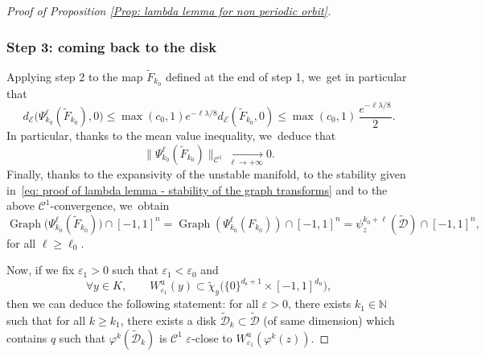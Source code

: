 \documentclass[11pt]{article}
\newcommand{\rs}{\mathrm{s}}
\newcommand{\ru}{\mathrm{u}}
\theoremstyle{definition}
\theoremstyle{plain}
\newcommand{\Ccal}{\mathcal{C}}
\newcommand{\D}{\mathcal{D}}
\newcommand{\Ecal}{\mathcal{E}}
\newcommand{\N}{\mathbb{N}}
\DeclareMathOperator{\Graph}{Graph}
\begin{document}
\begin{appendix}
\begin{proof}[Proof of Proposition \ref{Prop: lambda lemma for non periodic orbit}]
\subsubsection*{Step 3: coming back to the disk}
Applying step 2 to the map $\widetilde{F}_{k_0}$ defined at the end of step 1, we~get in particular that
\[
d_{\Ecal} \bigl(\Psi_{k_0}^{\ell} (\widetilde{F}_{k_0}), 0 \bigr) \leq \max (c_0, 1) e^{- \ell \lambda/8} d_{\Ecal}(\widetilde{F}_{k_0}, 0) \leq \max (c_0, 1)\, \frac{e^{- \ell \lambda/8}}{2}.
\]
In particular, thanks to the mean value inequality, we~deduce that
\[
\bigl\| \Psi_{k_0}^{\ell} (\widetilde{F}_{k_0}) \bigr\|_{\Ccal^1} \underset{\ell \to +\infty}{\to} 0.
\]
Finally, thanks to the expansivity of the unstable manifold, to the stability given in~\eqref{eq: proof of lambda lemma - stability of the graph transforms} and to the above $\Ccal^1$-convergence, we~obtain
\[
\Graph \bigl(\Psi_{k_0}^{\ell} (\widetilde{F}_{k_0}) \bigr) \cap [-1,1]^n = \Graph \left(\Psi_{k_0}^{\ell} (F_{k_0}) \right) \cap [-1,1]^n = \psi_z^{k_0 + \ell}(\widetilde{\D}) \cap [-1,1]^n,
\]
for all $\ell \geq \ell_0$.

Now, if we fix $\varepsilon_1 > 0$ such that $\varepsilon_1 < \varepsilon_0$ and
\[
\forall y \in K, \qquad W_{\varepsilon_1}^\ru (y) \subset \widetilde{\chi}_{y} \bigl(\{0\}^{d_\rs + 1} \times [-1,1]^{d_\ru} \bigr),
\]
then we can deduce the following statement: for all $\varepsilon > 0$, there exists $k_1 \in \N$ such that for all $k \geq k_1$, there exists a disk $\widetilde{\D}_k \subset \widetilde{\D}$ (of same dimension) which contains $q$ such that $\varphi^k(\widetilde{\D}_k)$ is $\Ccal^{1}$ $\varepsilon$-close to $W_{\varepsilon_1}^\ru (\varphi^k (z))$.
\end{proof}

\end{appendix}

\end{document}
